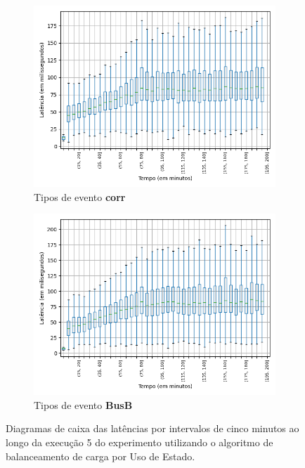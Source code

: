 \begin{figure}
\begin{subfigure}{.5\textwidth}
\centering
\includegraphics[width=\textwidth]{figuras/graphics/boxplot_10-dez-su_corr.png}
\caption{Tipos de evento \textbf{corr}}
\label{fig:BoxPlot_corr_SU_10-dez-su}
\end{subfigure}%
\begin{subfigure}{.5\textwidth}
\centering
\includegraphics[width=\textwidth]{figuras/graphics/boxplot_10-dez-su_busb.png}
\caption{Tipos de evento \textbf{BusB}}
\label{fig:BoxPlot_BusB_SU_10-dez-su}
\end{subfigure}%
\caption{Diagramas de caixa das latências por intervalos de cinco minutos ao longo da execução 5 do experimento utilizando o algoritmo de balanceamento de carga por Uso de Estado.}
\end{figure}




